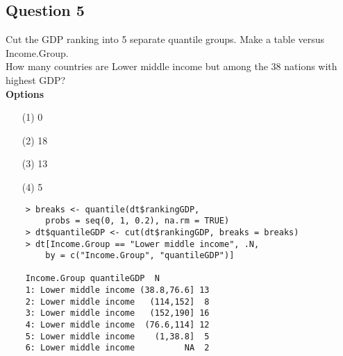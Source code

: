 \documentclass[]{article}
\begin{document}
\subsection*{Question 5}
Cut the GDP ranking into 5 separate quantile groups. Make a table versus Income.Group.
\\
 How many countries are Lower middle income but among the 38 nations with highest GDP?\\
\bigskip
\textbf{Options}
\begin{itemize}
\item[(1)] 0
\item[(2)]18
\item[(3)]13
\item[(4)] 5
\end{itemize}


\begin{framed}
	\begin{verbatim}
	> breaks <- quantile(dt$rankingGDP, 
	  	probs = seq(0, 1, 0.2), na.rm = TRUE)
	> dt$quantileGDP <- cut(dt$rankingGDP, breaks = breaks)
	> dt[Income.Group == "Lower middle income", .N, 
	   	by = c("Income.Group", "quantileGDP")]
	   	
	Income.Group quantileGDP  N
	1: Lower middle income (38.8,76.6] 13
	2: Lower middle income   (114,152]  8
	3: Lower middle income   (152,190] 16
	4: Lower middle income  (76.6,114] 12
	5: Lower middle income    (1,38.8]  5
	6: Lower middle income          NA  2
	\end{verbatim}
\end{framed}
\end{document}

